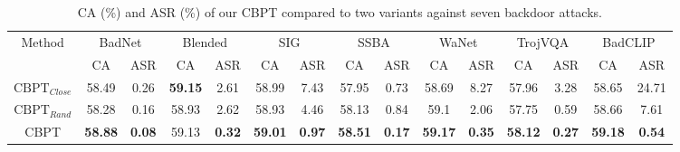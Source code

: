 \begin{table*}[htbp]
  \centering
  \caption{CA (\%) and ASR (\%) of our CBPT compared to two variants against seven backdoor attacks.}
  \resizebox{16.5cm}{!}
  {\begin{tabular}{ccccccccccccccc} 
    \toprule
    \multicolumn{1}{c}{\multirow{2}[0]{*}{Method}} 
    & \multicolumn{2}{c}{BadNet}          
    & \multicolumn{2}{c}{Blended}          
    & \multicolumn{2}{c}{SIG}          
    & \multicolumn{2}{c}{SSBA}          
    & \multicolumn{2}{c}{WaNet}          
    & \multicolumn{2}{c}{TrojVQA}          
    & \multicolumn{2}{c}{BadCLIP} \\ 

    \cmidrule(lr){2-3} 
    \cmidrule(lr){4-5} 
    \cmidrule(lr){6-7} 
    \cmidrule(lr){8-9} 
    \cmidrule(lr){10-11} 
    \cmidrule(lr){12-13} 
    \cmidrule(lr){14-15}
    
    & CA & ASR 
    & CA & ASR 
    & CA & ASR 
    & CA & ASR 
    & CA & ASR 
    & CA & ASR 
    & CA & ASR \\ 
    
    \midrule
    
    $\text{CBPT}_{Close}$   
    & 58.49    & 0.26     & \textbf{59.15} & 2.61     & 58.99    & 7.43     & 57.95    & 0.73     & 58.69    & 8.27     & 57.96    & 3.28     & 58.65    & 24.71 \\
    
    $\text{CBPT}_{Rand}$         
    & 58.28    & 0.16     & 58.93    & 2.62     & 58.93    & 4.46     & 58.13    & 0.84     & 59.1     & 2.06     & 57.75    & 0.59     & 58.66    & 7.61 \\
    
    
    \cellcolor[gray]{0.9} CBPT        
    & \cellcolor[gray]{0.9}\textbf{58.88} & \cellcolor[gray]{0.9}\textbf{0.08} & \cellcolor[gray]{0.9}59.13    & \cellcolor[gray]{0.9}\textbf{0.32} & \cellcolor[gray]{0.9}\textbf{59.01} & \cellcolor[gray]{0.9}\textbf{0.97} & \cellcolor[gray]{0.9}\textbf{58.51} & \cellcolor[gray]{0.9}\textbf{0.17} & \cellcolor[gray]{0.9}\textbf{59.17} & \cellcolor[gray]{0.9}\textbf{0.35} & \cellcolor[gray]{0.9}\textbf{58.12} & \cellcolor[gray]{0.9}\textbf{0.27} & \cellcolor[gray]{0.9}\textbf{59.18} & \cellcolor[gray]{0.9}\textbf{0.54} \\ 
    
    \bottomrule
  \end{tabular}
  }
  \label{tab:sample}%
\end{table*}



